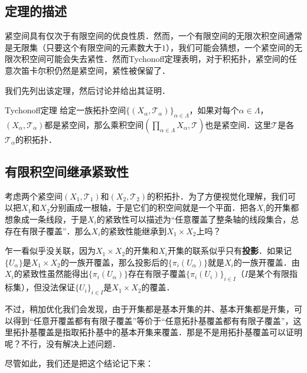 

\subsection{定理的描述}

紧空间具有仅次于有限空间的优良性质．然而，一个有限空间的无限次积空间通常是无限集（只要这个有限空间的元素数大于$1$），我们可能会猜想，一个紧空间的无限次积空间可能会失去紧性．然而Tychonoff定理表明，对于积拓扑，紧空间的任意次笛卡尔积仍然是紧空间，紧性被保留了．

我们先列出该定理，然后讨论并给出其证明．

\begin{theorem}{Tychonoff定理}
给定一族拓扑空间$\{(X_\alpha, \mathcal{T}_\alpha)\}_{\alpha\in \Lambda}$，如果对每个$\alpha\in\Lambda$，$(X_\alpha, \mathcal{T}_\alpha)$都是紧空间，那么乘积空间$(\prod_{\alpha\in\Lambda}X_\alpha, \mathcal{T})$也是紧空间．这里$\mathcal{T}$是各$\mathcal{T}_\alpha$的积拓扑．
\end{theorem}



\subsection{有限积空间继承紧致性}

考虑两个紧空间$(X_1, \mathcal{T}_1)$和$(X_2, \mathcal{T}_2)$的积拓扑．为了方便视觉化理解，我们可以把$X_1$和$X_2$分别画成一根轴，于是它们的积空间就是一个平面．把各$X_i$的开集都想象成一条线段，于是$X_i$的紧致性可以描述为“任意覆盖了整条轴的线段集合，总存在有限子覆盖”．那么$X_i$的紧致性能继承到$X_1\times X_2$上吗？

乍一看似乎没关联，因为$X_1\times X_2$的开集和$X_i$开集的联系似乎只有\textbf{投影}．如果记$\{U_\alpha\}$是$X_1\times X_2$的一族开覆盖，那么投影后的$\{\pi_i(U_\alpha)\}$就是$X_i$的一族开覆盖．由$X_i$的紧致性虽然能得出$\{\pi_i(U_\alpha)\}$存在有限子覆盖$\{\pi_i(U_i)\}_{i\in I}$（$I$是某个有限指标集），但没法保证$\{U_i\}_{i\in I}$是$X_1\times X_2$的覆盖．

不过，稍加优化我们会发现，由于开集都是基本开集的并、基本开集都是开集，可以得到“任意开覆盖都有有限子覆盖”等价于“任意拓扑基覆盖都有有限子覆盖”，这里拓扑基覆盖是指取拓扑基中的基本开集来覆盖．那是不是用拓扑基覆盖可以证明呢？不行，没有解决上述问题．

尽管如此，我们还是把这个结论记下来：

